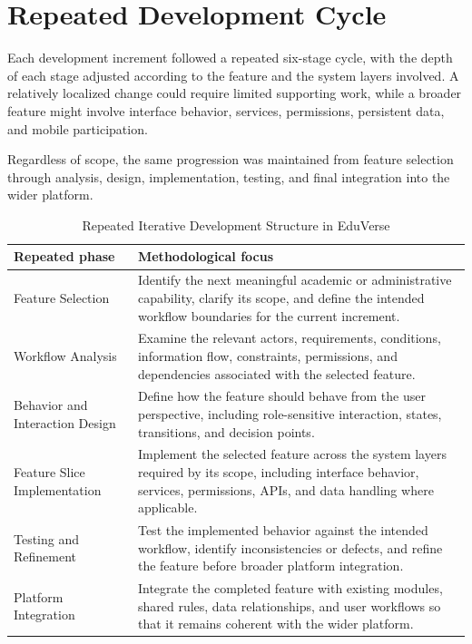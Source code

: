 \section{Repeated Development Cycle}\label{sec:development_workflow_structure}

Each development increment followed a repeated six-stage cycle, with the depth
of each stage adjusted according to the feature and the system layers involved.
A relatively localized change could require limited supporting work, while a
broader feature might involve interface behavior, services, permissions,
persistent data, and mobile participation.

Regardless of scope, the same progression was maintained from feature selection
through analysis, design, implementation, testing, and final integration into
the wider platform.

\begin{table}[htbp]
  \centering
  \small
  \renewcommand{\arraystretch}{1.15}
  \setlength{\tabcolsep}{5pt}
  \caption{Repeated Iterative Development Structure in EduVerse}
  \label{tab:eduverse_iterative_development_structure}
  \begin{tabular}{|>{\raggedright\arraybackslash}p{}|>{\raggedright\arraybackslash}p{}|}
    \hline
    \textbf{Repeated phase} & \textbf{Methodological focus} \\
    \hline
    Feature Selection & Identify the next meaningful academic or administrative capability, clarify its scope, and define the intended workflow boundaries for the current increment. \\
    \hline
    Workflow Analysis & Examine the relevant actors, requirements, conditions, information flow, constraints, permissions, and dependencies associated with the selected feature. \\
    \hline
    Behavior and Interaction Design & Define how the feature should behave from the user perspective, including role-sensitive interaction, states, transitions, and decision points. \\
    \hline
    Feature Slice Implementation & Implement the selected feature across the system layers required by its scope, including interface behavior, services, permissions, APIs, and data handling where applicable. \\
    \hline
    Testing and Refinement & Test the implemented behavior against the intended workflow, identify inconsistencies or defects, and refine the feature before broader platform integration. \\
    \hline
    Platform Integration & Integrate the completed feature with existing modules, shared rules, data relationships, and user workflows so that it remains coherent with the wider platform. \\
    \hline
  \end{tabular}
\end{table}

